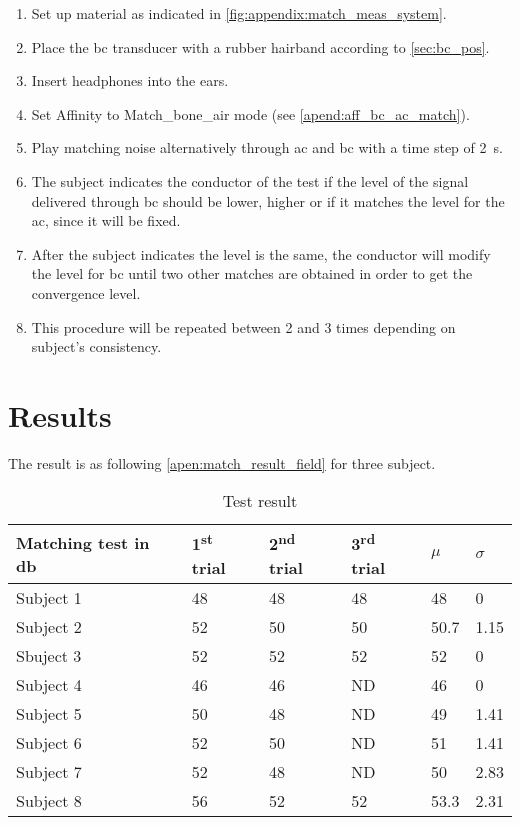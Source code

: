 \begin{enumerate}
\item Set up material as indicated in \autoref{fig:appendix:match_meas_system}.
\item Place the \gls{bc} transducer with a rubber hairband according to \autoref{sec:bc_pos}.
\item Insert headphones into the ears.
\item Set Affinity to Match_bone_air mode (see \autoref{apend:aff_bc_ac_match}).
\item Play matching noise alternatively through \gls{ac} and \gls{bc} with a time step of \SI{2}{\second}.
\item The  subject indicates the conductor of the test if the level of the signal delivered through \gls{bc} should be lower, higher or if it matches the level for the \gls{ac}, since it will be fixed.
\item After the subject indicates the level is the same, the conductor will modify the level for \gls{bc} until two other matches are obtained in order to get the convergence level.
\item This procedure will be repeated between 2 and 3 times depending on subject's consistency.
\end{enumerate}

\section*{Results}

The result is as following \autoref{apen:match_result_field} for three subject. 

\begin{table}[H]
\centering
\caption{Test result}
\begin{tabular}{l|lll|ll}
Matching test in \si{\decibel}   & 1\textsuperscript{st} trial & 2\textsuperscript{nd} trial & 3\textsuperscript{rd} trial & $\mu$ & $\sigma$ \\ \hline
Subject 1  & 48          & 48           & 48          & 48          & 0                  \\
Subject 2  & 52          & 50           & 50          & 50.7        & 1.15               \\
Sbuject 3  & 52          & 52           & 52          & 52          & 0                  \\
Subject 4  & 46          & 46           & ND          & 46          & 0                  \\
Subject 5  & 50          & 48           & ND          & 49          & 1.41               \\
Subject 6  & 52          & 50           & ND          & 51          & 1.41               \\
Subject 7  & 52          & 48           & ND          & 50          & 2.83               \\
Subject 8  & 56          & 52           & 52          & 53.3        & 2.31             
\end{tabular}
\label{apen:match_result_field}
\end{table}

